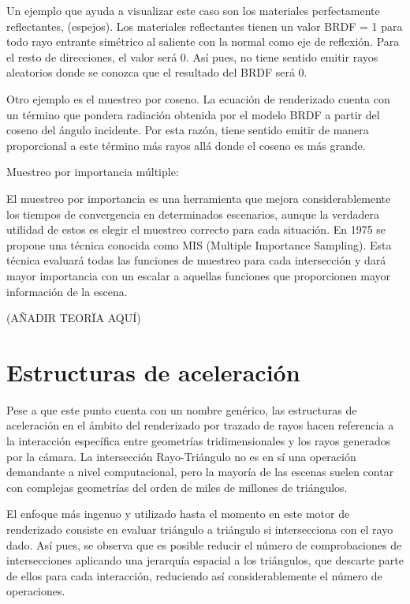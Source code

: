 Un ejemplo que ayuda a visualizar este caso son los materiales perfectamente reflectantes, (espejos). Los materiales reflectantes tienen un valor BRDF = 1 para todo rayo entrante simétrico al saliente con la normal como eje de reflexión. Para el resto de direcciones, el valor será 0. Así pues, no tiene sentido emitir rayos aleatorios donde se conozca que el resultado del BRDF será 0.

Otro ejemplo es el muestreo por coseno. La ecuación de renderizado cuenta con un término que pondera radiación obtenida por el modelo BRDF a partir del coseno del ángulo incidente. Por esta razón, tiene sentido emitir de manera proporcional a este término más rayos allá donde el coseno es más grande.

Muestreo por importancia múltiple:

El muestreo por importancia es una herramienta que mejora considerablemente los tiempos de convergencia en determinados escenarios, aunque la verdadera utilidad de estos es elegir el muestreo correcto para cada situación. En 1975 se propone una técnica conocida como MIS (Multiple Importance Sampling). Esta técnica evaluará todas las funciones de  muestreo para cada intersección y dará mayor importancia con un escalar a aquellas funciones que proporcionen mayor información de la escena.

(AÑADIR TEORÏA AQUÍ)







\section{Estructuras de aceleración}
	
Pese a que este punto cuenta con un nombre genérico, las estructuras de aceleración en el ámbito del renderizado por trazado de rayos hacen referencia a la interacción específica entre geometrías tridimensionales y los rayos generados por la cámara. La intersección Rayo-Triángulo no es en sí una operación demandante a nivel computacional, pero la mayoría de las escenas suelen contar con complejas geometrías del orden de miles de millones de triángulos.

El enfoque más ingenuo y utilizado hasta el momento en este motor de renderizado consiste en evaluar triángulo a triángulo si intersecciona con el rayo dado. Así pues, se observa que es posible reducir el número de comprobaciones de intersecciones aplicando una jerarquía espacial a los triángulos, que descarte parte de ellos para cada interacción, reduciendo así considerablemente el número de operaciones.


